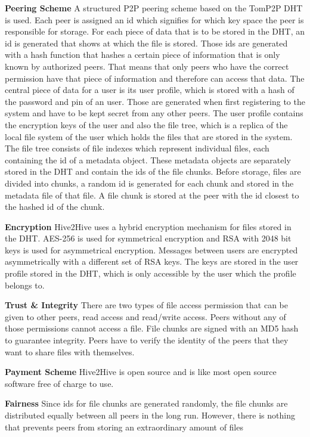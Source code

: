 \textbf{Peering Scheme}
A structured P2P peering scheme based on the TomP2P DHT is used. Each peer is assigned an id which signifies for which key space the peer is responsible for storage. For each piece of data that is to be stored in the DHT, an id is generated that shows at which the file is stored. Those ids are generated with a hash function that hashes a certain piece of information that is only known by authorized peers. That means that only peers who have the correct permission have that piece of information and therefore can access that data.
The central piece of data for a user is its user profile, which is stored with a hash of the password and pin of an user. Those are generated when first registering to the system and have to be kept secret from any other peers. The user profile contains the encryption keys of the user and also the file tree, which is a replica of the local file system of the user which holds the files that are stored in the system. The file tree consists of file indexes which represent individual files, each containing the id of a metadata object. These metadata objects are separately stored in the DHT and contain the ids of the file chunks. Before storage, files are divided into chunks, a random id is generated for each chunk and stored in the metadata file of that file. A file chunk is stored at the peer with the id closest to the hashed id of the chunk.

\textbf{Encryption}
Hive2Hive uses a hybrid encryption mechanism for files stored in the DHT. AES-256 is used for symmetrical encryption and RSA with 2048 bit keys is used for asymmetrical encryption. Messages between users are encrypted asymmetrically with a different set of RSA keys.
The keys are stored in the user profile stored in the DHT, which is only accessible by the user which the profile belongs to.

\textbf{Trust \& Integrity}
There are two types of file access permission that can be given to other peers, read access and read/write access. Peers without any of those permissions cannot access a file. File chunks are signed with an MD5 hash to guarantee integrity. Peers have to verify the identity of the peers that they want to share files with themselves.

\textbf{Payment Scheme}
Hive2Hive is open source and is like most open source software free of charge to use.

\textbf{Fairness}
Since ids for file chunks are generated randomly, the file chunks are distributed equally between all peers in the long run. However, there is nothing that prevents peers from storing an extraordinary amount of files


